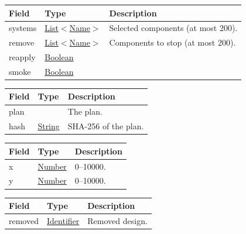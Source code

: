 \documentclass[a4paper]{arrowhead}
\newcommand{\mref}[2][]{{\textcolor{ArrowheadPurple}{\hyperref[sec:model:#2]{\ifstrempty{#1}{#2}{#1}}}}}
\newcommand{\pref}[1]{{\textcolor{ArrowheadGrey}{\hyperref[sec:model:primitives:#1]{#1}}}}
\begin{document}

\noindent\begin{tabularx}{\textwidth}{| >{\raggedright\arraybackslash}p{3.6cm} | >{\raggedright\arraybackslash\small}p{4.4cm} | X |} \hline
\rowcolor{gray!33} Field & Type & Description \\ \hline
systems & \pref{List}$<$\pref{Name}$>$ & Selected components (at most 200). \\ \hline
remove & \pref{List}$<$\pref{Name}$>$ & Components to stop (at most 200). \\ \hline
reapply & \pref{Boolean} &  \\ \hline
smoke & \pref{Boolean} &  \\ \hline
\end{tabularx}


\noindent\begin{tabularx}{\textwidth}{| >{\raggedright\arraybackslash}p{3.6cm} | >{\raggedright\arraybackslash\small}p{4.4cm} | X |} \hline
\rowcolor{gray!33} Field & Type & Description \\ \hline
plan & \mref{Plan} & The plan. \\ \hline
hash & \pref{String} & SHA-256 of the plan. \\ \hline
\end{tabularx}


\noindent\begin{tabularx}{\textwidth}{| >{\raggedright\arraybackslash}p{3.6cm} | >{\raggedright\arraybackslash\small}p{4.4cm} | X |} \hline
\rowcolor{gray!33} Field & Type & Description \\ \hline
x & \pref{Number} & 0--10000. \\ \hline
y & \pref{Number} & 0--10000. \\ \hline
\end{tabularx}


\noindent\begin{tabularx}{\textwidth}{| >{\raggedright\arraybackslash}p{3.6cm} | >{\raggedright\arraybackslash\small}p{4.4cm} | X |} \hline
\rowcolor{gray!33} Field & Type & Description \\ \hline
removed & \pref{Identifier} & Removed design. \\ \hline
\end{tabularx}
\end{document}
